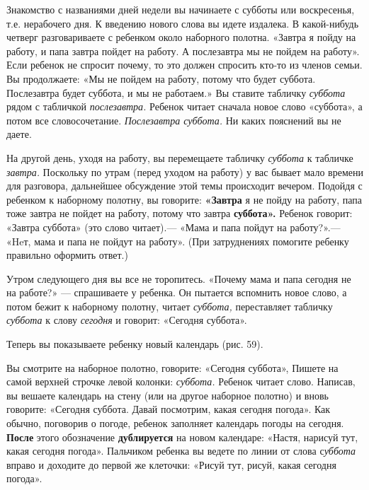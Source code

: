 \documentclass{book}
\renewcommand{\emph}[1]{\textit{#1}}
\begin{document}
Знакомство с названиями дней недели вы начинаете с субботы или
воскресенья, т.е. нерабочего дня. К введению нового слова вы идете
издалека. В какой-нибудь четверг разговариваете с ребенком около
наборного полотна. «Завтра я пойду на работу, и папа завтра пойдет на
работу. А послезавтра мы не пойдем на работу». Если ребенок не спросит
почему, то это должен спросить кто-то из членов семьи. Вы продолжаете:
«Мы не пойдем на работу, потому что будет суббота. Послезавтра будет
суббота, и мы не работаем.» Вы ставите табличку \emph{суббота} рядом с
табличкой \emph{послезавтра.} Ребенок читает сначала новое слово
«суббота», а потом все словосочетание. \emph{Послезавтра суббота.} Ни
каких пояснений вы не даете.

На другой день, уходя на работу, вы перемещаете табличку \emph{суббота}
к табличке \emph{завтра.} Поскольку по утрам (перед уходом на работу) у
вас бывает мало времени для разговора, дальнейшее обсуждение этой темы
происходит вечером. Подойдя с ребенком к наборному полотну, вы говорите:
\textbf{«Завтра} я не пойду на работу, папа тоже завтра не пойдет на
работу, потому что завтра \textbf{суббота».} Ребенок говорит: «Завтра
суббота» (это слово читает).--- «Мама и папа пойдут на работу?».---
«Heт, мама и папа не пойдут на работу». (При затруднениях помогите
ребенку правильно оформить ответ.)

Утром следующего дня вы все не торопитесь. «Почему мама и папа сегодня
не на работе?» --- спрашиваете у ребенка. Он пытается вспомнить новое
слово, а потом бежит к наборному полотну, читает \emph{суббота,}
переставляет табличку \emph{суббота} к слову \emph{сегодня} и говорит:
«Сегодня суббота».

Теперь вы показываете ребенку новый календарь (рис. 59).

Вы смотрите на наборное полотно, говорите: «Сегодня суббота», Пишете на
самой верхней строчке левой колонки: \emph{суббота.} Ребенок читает
слово. Написав, вы вешаете календарь на стену (или на другое наборное
полотно) и вновь говорите: «Сегодня суббота. Давай посмотрим, какая
сегодня погода». Как обычно, поговорив о погоде, ребенок заполняет
календарь погоды на сегодня. \textbf{После} этого обозначение
\textbf{дублируется} на новом календаре: «Настя, нарисуй тут, какая
сегодня погода». Пальчиком ребенка вы ведете по линии от слова
с\emph{уббота} вправо и доходите до первой же клеточки: «Рисуй тут,
рисуй, какая сегодня погода».
\end{document}
